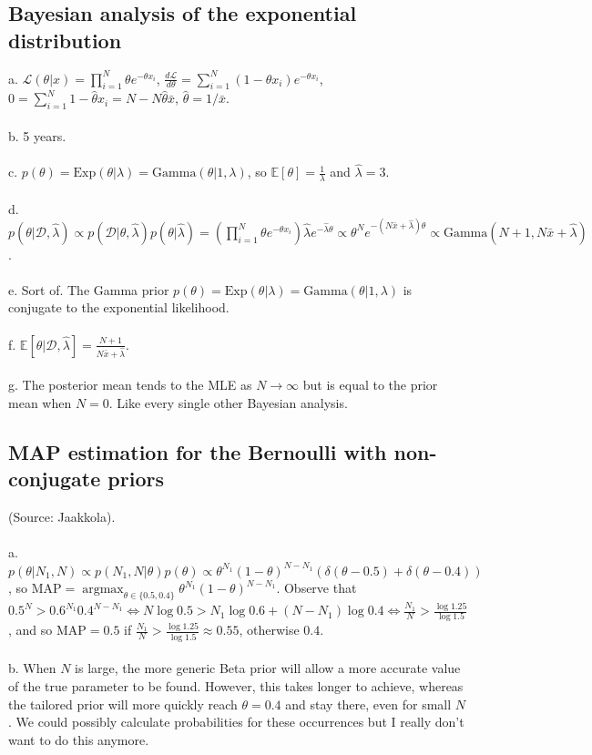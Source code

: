 \documentclass{article}
\DeclareMathOperator*{\argmax}{argmax}
\begin{document}
\subsection{Bayesian analysis of the exponential distribution}
a. $\mathcal{L}(\theta|x) = \prod_{i=1}^N \theta e^{-\theta x_i}$, $\frac{d\mathcal{L}}{d\theta} = \sum_{i=1}^N (1-\theta x_i)e^{-\theta x_i}$, $0 = \sum_{i=1}^N 1-\hat\theta x_i = N - N\hat\theta \bar{x}$, $\hat\theta = 1/\bar{x}$.\\\\
b. 5 years.\\\\
c. $p(\theta) = \mathrm{Exp}(\theta|\lambda) = \mathrm{Gamma}(\theta|1, \lambda)$, so $\mathbb{E}[\theta] = \frac{1}{\lambda}$ and $\hat\lambda = 3$.\\\\
d. $p(\theta|\mathcal{D}, \hat\lambda) \propto p(\mathcal{D}|\theta,\hat\lambda)p(\theta|\hat\lambda) = \left(\prod_{i=1}^N \theta e^{-\theta x_i}\right) \hat\lambda e^{-\hat\lambda\theta} \propto \theta^N e^{-(N\bar{x}+\hat\lambda)\theta} \propto \mathrm{Gamma}(N+1, N\bar{x}+\hat\lambda)$.\\\\
e. Sort of. The Gamma prior $p(\theta) = \mathrm{Exp}(\theta|\lambda) = \mathrm{Gamma}(\theta|1, \lambda)$ is conjugate to the exponential likelihood.\\\\
f. $\mathbb{E}[\theta|\mathcal{D},\hat\lambda] = \frac{N+1}{N\bar{x}+\hat\lambda}$.\\\\
g. The posterior mean tends to the MLE as $N\rightarrow\infty$ but is equal to the prior mean when $N=0$. Like every single other Bayesian analysis.

\subsection{MAP estimation for the Bernoulli with non-conjugate priors}
(Source: Jaakkola).\\\\
a. $p(\theta|N_1, N) \propto p(N_1, N|\theta)p(\theta) \propto \theta^{N_1}(1-\theta)^{N-N_1} (\delta(\theta-0.5)+\delta(\theta-0.4))$, so $\mathrm{MAP} = \argmax_{\theta\in\{0.5,0.4\}} \theta^{N_1}(1-\theta)^{N-N_1}$. Observe that $0.5^N > 0.6^{N_1}0.4^{N-N_1} \iff N\log0.5 > N_1\log0.6 + (N-N_1)\log0.4 \iff \frac{N_1}{N} > \frac{\log1.25}{\log1.5}$, and so $\mathrm{MAP} = 0.5$ if $\frac{N_1}{N} > \frac{\log1.25}{\log1.5} \approx 0.55$, otherwise $0.4$.\\\\
b. When $N$ is large, the more generic Beta prior will allow a more accurate value of the true parameter to be found. However, this takes longer to achieve, whereas the tailored prior will more quickly reach $\theta = 0.4$ and stay there, even for small $N$. We could possibly calculate probabilities for these occurrences but I really don't want to do this anymore.
\end{document}
